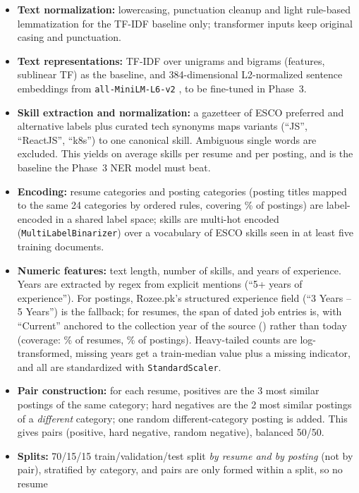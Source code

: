 \documentclass[11pt,a4paper]{article}
\newcommand{\code}[1]{\texttt{\small #1}}
\begin{document}
\begin{itemize}
\item \textbf{Text normalization:} lowercasing, punctuation cleanup and light rule-based
lemmatization for the TF-IDF baseline only; transformer inputs keep original casing and punctuation.
\item \textbf{Text representations:} TF-IDF over unigrams and bigrams (\TfidfVocab features,
sublinear TF) as the baseline, and 384-dimensional L2-normalized sentence embeddings from
\code{all-MiniLM-L6-v2} \cite{sbert}, to be fine-tuned in Phase~3.
\item \textbf{Skill extraction and normalization:} a gazetteer of ESCO preferred and alternative
labels plus curated tech synonyms maps variants (``JS'', ``ReactJS'', ``k8s'') to one canonical
skill. Ambiguous single words are excluded. This yields on average \MeanSkillsRes skills per
resume and \MeanSkillsJob per posting, and is the baseline the Phase~3 NER model must beat.
\item \textbf{Encoding:} resume categories and posting categories (posting titles mapped to the
same 24 categories by ordered rules, covering \JobCatCov\% of postings) are label-encoded in a
shared label space; skills are multi-hot encoded (\code{MultiLabelBinarizer}) over a vocabulary
of \SkillVocab ESCO skills seen in at least five training documents.
\item \textbf{Numeric features:} text length, number of skills, and years of experience. Years
are extracted by regex from explicit mentions (``5+ years of experience''). For postings,
Rozee.pk's structured experience field (``3 Years -- 5 Years'') is the fallback; for resumes,
the span of dated job entries is, with ``Current'' anchored to the collection year of the source
(\RefYear) rather than today (coverage: \YearsCovRes\% of resumes, \YearsCovJob\% of postings).
Heavy-tailed counts are log-transformed, missing years get a train-median value plus a missing
indicator, and all are standardized with \code{StandardScaler}.
\item \textbf{Pair construction:} for each resume, positives are the 3 most similar postings of
the same category; hard negatives are the 2 most similar postings of a \emph{different}
category; one random different-category posting is added. This gives \Pairs pairs
(\PairsPos positive, \PairsHard hard negative, \PairsRand random negative), balanced 50/50.
\item \textbf{Splits:} 70/15/15 train/validation/test split \emph{by resume and by posting}
(not by pair), stratified by category, and pairs are only formed within a split, so no resume

\end{itemize}
\end{document}

